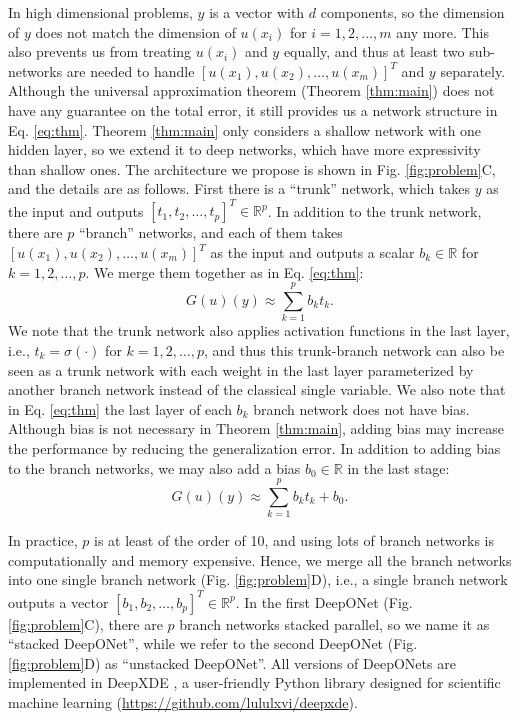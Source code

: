 \documentclass[11pt]{article}
\begin{document}
In high dimensional problems, $y$ is a vector with $d$ components, so the dimension of $y$ does not match the dimension of $u(x_i)$ for $i=1,2,\dots,m$ any more. This also prevents us from treating $u(x_i)$ and $y$ equally, and thus at least two sub-networks are needed to handle $[u(x_1), u(x_2), \dots, u(x_m)]^T$ and $y$ separately. Although the universal approximation theorem (Theorem \ref{thm:main}) does not have any guarantee on the total error, it still provides us a network structure in Eq. \ref{eq:thm}. Theorem \ref{thm:main} only considers a shallow network with one hidden layer, so we extend it to deep networks, which have more expressivity than shallow ones. The architecture we propose is shown in Fig. \ref{fig:problem}C, and the details are as follows. First there is a ``trunk'' network, which takes $y$ as the input and outputs $[t_1, t_2, \dots, t_p]^T \in \mathbb{R}^p$. In addition to the trunk network, there are $p$ ``branch'' networks, and each of them takes $[u(x_1), u(x_2), \dots, u(x_m)]^T$ as the input and outputs a scalar $b_k \in \mathbb{R}$ for $k=1,2,\dots,p$. We merge them together as in Eq. \ref{eq:thm}:
\[ G(u)(y) \approx \sum_{k=1}^p b_k t_k. \]
We note that the trunk network also applies activation functions in the last layer, i.e., $t_k = \sigma(\cdot)$ for $k=1,2,\dots,p$, and thus this trunk-branch network can also be seen as a trunk network with each weight in the last layer parameterized by another branch network instead of the classical single variable. We also note that in Eq. \ref{eq:thm} the last layer of each $b_k$ branch network does not have bias. Although bias is not necessary in Theorem \ref{thm:main}, adding bias may increase the performance by reducing the generalization error. In addition to adding bias to the branch networks, we may also add a bias $b_0 \in \mathbb{R}$ in the last stage:
\begin{equation}\label{eq:guy}
G(u)(y) \approx \sum_{k=1}^p b_k t_k + b_0.
\end{equation}

In practice, $p$ is at least of the order of 10, and using lots of branch networks is computationally and memory expensive. Hence, we merge all the branch networks into one single branch network (Fig. \ref{fig:problem}D), i.e., a single branch network outputs a vector $[b_1, b_2, \dots, b_p]^T \in \mathbb{R}^p$. In the first DeepONet (Fig. \ref{fig:problem}C), there are $p$ branch networks stacked parallel, so we name it as ``stacked DeepONet'', while we refer to the second DeepONet (Fig. \ref{fig:problem}D) as ``unstacked DeepONet''. All versions of DeepONets are implemented in DeepXDE \cite{lu2019deepxde}, a user-friendly Python library designed for scientific machine learning (\url{https://github.com/lululxvi/deepxde}).
\end{document}
